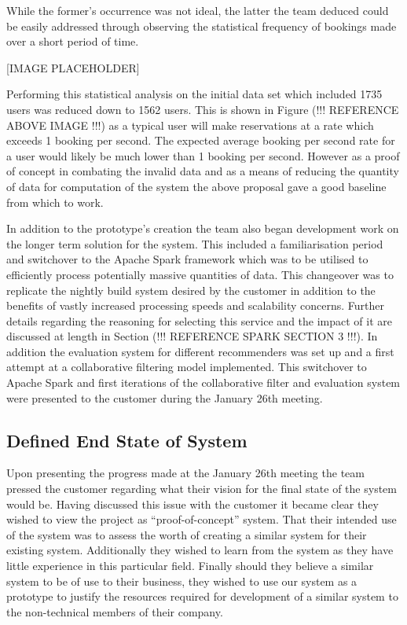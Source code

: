 \documentclass{l3proj}
\begin{document}
While the former’s occurrence was not ideal, the latter the team deduced could be easily addressed through observing the statistical frequency of bookings made over a short period of time.

[IMAGE PLACEHOLDER]

Performing this statistical analysis on the initial data set which included 1735 users was reduced down to 1562 users. This is shown in Figure (!!! REFERENCE ABOVE IMAGE !!!) as a typical user will make reservations at a rate which exceeds 1 booking per second. The expected average booking per second rate for a user would likely be much lower than 1 booking per second. However as a proof of concept in combating the invalid data and as a means of reducing the quantity of data for computation of the system the above proposal gave a good baseline from which to work.

In addition to the prototype’s creation the team also began development work on the longer term solution for the system. This included a familiarisation period and switchover to the Apache Spark framework which was to be utilised to efficiently process potentially massive quantities of data. This changeover was to replicate the nightly build system desired by the customer in addition to the benefits of vastly increased processing speeds and scalability concerns. Further details regarding the reasoning for selecting this service and the impact of it are discussed at length in Section (!!! REFERENCE SPARK SECTION 3 !!!). In addition the evaluation system for different recommenders was set up and a first attempt at a collaborative filtering model implemented. This switchover to Apache Spark and first iterations of the collaborative filter and evaluation system were presented to the customer during the January 26th meeting.


\subsection{Defined End State of System}
\label{jandefinedstate}

Upon presenting the progress made at the January 26th meeting the team pressed the customer regarding what their vision for the final state of the system would be. Having discussed this issue with the customer it became clear they wished to view the project as “proof-of-concept” system. That their intended use of the system was to assess the worth of creating a similar system for their existing system. Additionally they wished to learn from the system as they have little experience in this particular field. Finally should they believe a similar system to be of use to their business, they wished to use our system as a prototype to justify the resources required for development of a similar system to the non-technical members of their company.
\end{document}
